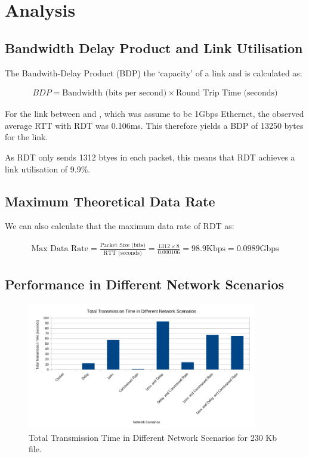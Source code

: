 \section{Analysis}

\subsection{Bandwidth Delay Product and Link Utilisation}
\label{sec:link}

The Bandwith-Delay Product (BDP) the `capacity' of a link and is calculated as:

\begin{align*}
    BDP = \text{Bandwidth (bits per second)} \times \text{Round Trip Time (seconds)}
\end{align*}

For the link between  and , which was assume to be 1Gbps Ethernet, the observed average RTT with RDT was 0.106ms. This therefore yields a BDP of 13250 bytes for the link.

As RDT only sends 1312 btyes in each packet, this means that RDT achieves a link utilisation of 9.9\%.

\subsection{Maximum Theoretical Data Rate}

We can also calculate that the maximum data rate of RDT as: 

\begin{align*}
    \text{Max Data Rate} = \frac{\text{Packet Size (bits)}}{\text{RTT (seconds)}} = \frac{1312 \times 8}{0.000106} = 98.9 \text{Kbps} = 0.0989 \text{Gbps} 
\end{align*}

\subsection{Performance in Different Network Scenarios}
\label{sec:performance}

\begin{figure}[H]
\begin{center}
    \includegraphics[width=100mm]{images/performance-network-scenarios.png}
\end{center}
\caption{Total Transmission Time in Different Network Scenarios for 230 Kb file.}\label{fig:performance}
\end{figure}

